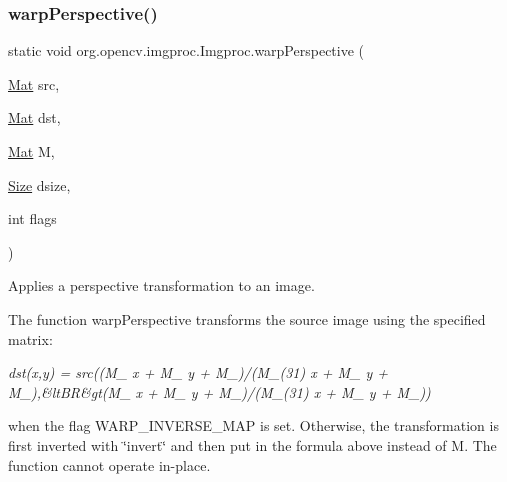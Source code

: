 \subsubsection{\texorpdfstring{warp\+Perspective()}{warpPerspective()}\hspace{0.1cm}{\footnotesize\ttfamily [2/3]}}
{\footnotesize\ttfamily static void org.\+opencv.\+imgproc.\+Imgproc.\+warp\+Perspective (\begin{DoxyParamCaption}\item[{\mbox{\hyperlink{classorg_1_1opencv_1_1core_1_1_mat}{Mat}}}]{src,  }\item[{\mbox{\hyperlink{classorg_1_1opencv_1_1core_1_1_mat}{Mat}}}]{dst,  }\item[{\mbox{\hyperlink{classorg_1_1opencv_1_1core_1_1_mat}{Mat}}}]{M,  }\item[{\mbox{\hyperlink{classorg_1_1opencv_1_1core_1_1_size}{Size}}}]{dsize,  }\item[{int}]{flags }\end{DoxyParamCaption})\hspace{0.3cm}{\ttfamily [static]}}

Applies a perspective transformation to an image.

The function {\ttfamily warp\+Perspective} transforms the source image using the specified matrix\+:

{\itshape dst(x,y) = src((M\+\_ x + M\+\_ y + M\+\_)/(M\+\_\+(31) x + M\+\_ y + M\+\_),\&lt\+BR\&gt(M\+\_ x + M\+\_ y + M\+\_)/(M\+\_\+(31) x + M\+\_ y + M\+\_))}

when the flag {\ttfamily W\+A\+R\+P\+\_\+\+I\+N\+V\+E\+R\+S\+E\+\_\+\+M\+AP} is set. Otherwise, the transformation is first inverted with \char`\"{}invert\char`\"{} and then put in the formula above instead of {\ttfamily M}. The function cannot operate in-\/place.


